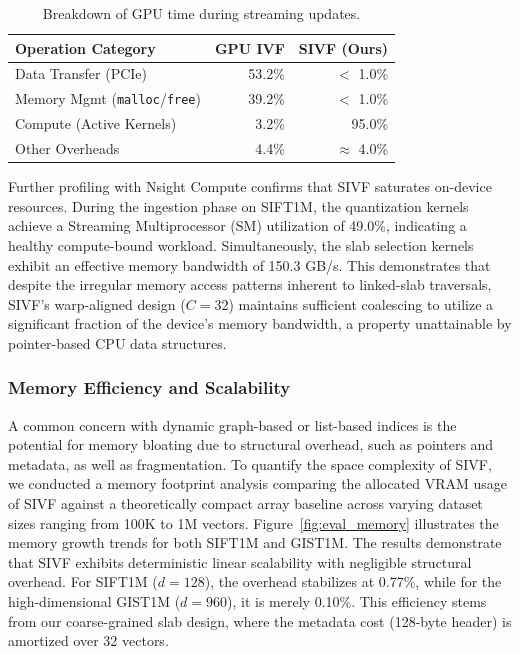 \documentclass[sigconf,nonacm]{acmart}
\theoremstyle{plain}
\theoremstyle{definition}
\theoremstyle{remark}
\begin{document}
\begin{table}[t]
\caption{Breakdown of GPU time during streaming updates.}
\label{tab:profiling_breakdown}
\centering
\begin{tabular}{l|r|r}
\toprule
Operation Category & GPU IVF & SIVF (Ours) \\
\midrule
Data Transfer (PCIe) & 53.2\% & $<$ 1.0\% \\
Memory Mgmt (\texttt{malloc}/\texttt{free}) & 39.2\% & $<$ 1.0\% \\
Compute (Active Kernels) & 3.2\% & 95.0\% \\
Other Overheads & 4.4\% & $\approx$ 4.0\% \\
\bottomrule
\end{tabular}
\end{table}

Further profiling with Nsight Compute confirms that SIVF saturates on-device resources.
During the ingestion phase on SIFT1M, the quantization kernels achieve a Streaming Multiprocessor (SM) utilization of 49.0\%, indicating a healthy compute-bound workload.
Simultaneously, the slab selection kernels exhibit an effective memory bandwidth of 150.3 GB/s.
This demonstrates that despite the irregular memory access patterns inherent to linked-slab traversals, SIVF's warp-aligned design ($C=32$) maintains sufficient coalescing to utilize a significant fraction of the device's memory bandwidth, a property unattainable by pointer-based CPU data structures.

\subsubsection{Memory Efficiency and Scalability}
\label{sec:eval_memory}

A common concern with dynamic graph-based or list-based indices is the potential for memory bloating due to structural overhead, such as pointers and metadata, as well as fragmentation. To quantify the space complexity of SIVF, we conducted a memory footprint analysis comparing the allocated VRAM usage of SIVF against a theoretically compact array baseline across varying dataset sizes ranging from 100K to 1M vectors.
Figure~\ref{fig:eval_memory} illustrates the memory growth trends for both SIFT1M and GIST1M. The results demonstrate that SIVF exhibits deterministic linear scalability with negligible structural overhead. For SIFT1M ($d=128$), the overhead stabilizes at 0.77\%, while for the high-dimensional GIST1M ($d=960$), it is merely 0.10\%. This efficiency stems from our coarse-grained slab design, where the metadata cost (128-byte header) is amortized over 32 vectors. 
\end{document}

